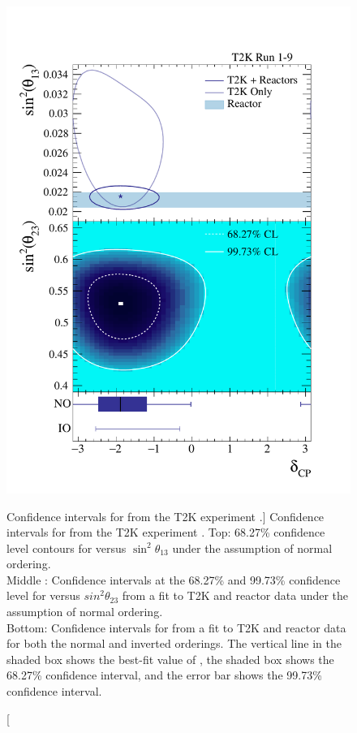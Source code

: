 {\begin{figure}
	\centering
	\includegraphics[height=0.6\textheight]{figures/t2k_cp.pdf}
	\caption
	[Confidence intervals for \dcp{} from the T2K experiment \cite{Abe2019}.]
	{Confidence intervals for \dcp{} from the T2K experiment \cite{Abe2019}. 
	Top: 68.27\% confidence level contours for \dcp{} versus $\sin^2\theta_{13}$ 
	under the assumption of normal ordering. \\
	Middle : Confidence intervals at the 68.27\% and 99.73\% confidence level for 
	\dcp{} versus $sin^2\theta_{23}$ from a fit to T2K and reactor data under the 
	assumption of normal ordering. \\
	Bottom: Confidence intervals for \dcp{} from a fit to T2K and reactor data for 
	both the normal and inverted orderings. The vertical line in the shaded box 
	shows the best-fit value of \dcp{}, the shaded box shows the 68.27\% 
	confidence interval, and the error bar shows the 99.73\% confidence interval. 
	}
	\label{fig:t2k_cp}
\end{figure}

}
